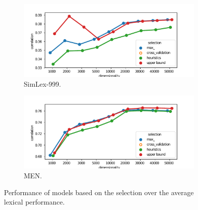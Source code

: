 \begin{figure}
  \centering

  \begin{subfigure}[t]{0.49\textwidth}
    \includegraphics[width=\textwidth]{supplement/figures/lexical-results-SimLex999}
    \caption{SimLex-999.}
    \label{fig:lexical-results-simlex}
  \end{subfigure}
  \begin{subfigure}[t]{0.49\textwidth}
    \includegraphics[width=\textwidth]{supplement/figures/lexical-results-men}
    \caption{MEN.}
    \label{fig:lexical-results-men}
  \end{subfigure}

  \caption{Performance of models based on the selection over the average lexical performance.}
  \label{fig:lexical-results}
\end{figure}

